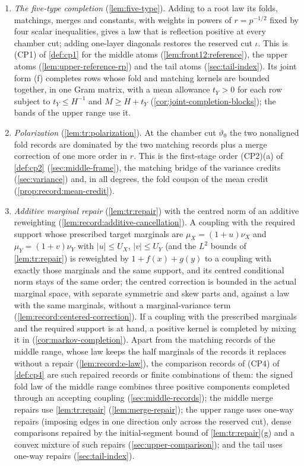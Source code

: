 \begin{enumerate}[label=(\arabic*)]
\item \emph{The five-type completion} (\cref{lem:five-type}). Adding to a
 root law its folds, matchings, merges and constants, with weights in powers
 of $r=p^{-1/2}$ fixed by four scalar inequalities, gives a law that is
 reflection positive at every chamber cut; adding one-layer diagonals
 restores the reserved cut $\iota$. This is (CP1) of \cref{def:cp1} for the
 middle atoms (\cref{lem:front12:reference}), the upper atoms
 (\cref{lem:upper-reference-rp}) and the tail atoms (\cref{sec:tail-index}).
 Its joint form (f) completes rows whose fold and matching kernels are bounded
 together, in one Gram matrix, with a mean allowance $t_Y>0$ for each row
 subject to $t_Y\le H^{-1}$ and $M\ge H+t_Y$
 (\cref{cor:joint-completion-blocks}); the bands of the upper range use it.
\item \emph{Polarization} (\cref{lem:tr:polarization}). At the chamber cut
 $\vartheta_0$ the two nonaligned fold records are dominated by the two
 matching records plus a merge correction of one more order in $r$. This is
 the first-stage order (CP2)(a) of \cref{def:cp2} (\cref{sec:middle-frame}),
 the matching bridge of the variance credits (\cref{sec:variance}) and, in all
 degrees, the fold coupon of the mean credit (\cref{prop:record:mean-credit}).
\item \emph{Additive marginal repair} (\cref{lem:tr:repair}) with the
 centred norm of an additive reweighting
 (\cref{lem:record:additive-cancellation}). A coupling with the required support whose prescribed target
 marginals are $\mu_X=(1+u)\nu_X$ and $\mu_Y=(1+v)\nu_Y$ with
 $|u|\le U_X$, $|v|\le U_Y$ (and the $L^2$ bounds of \cref{lem:tr:repair})
 is reweighted by $1+f(x)+g(y)$ to a coupling with exactly those marginals
 and the same support, and its centred conditional norm stays of the same order; the
 centred correction is bounded in the actual marginal space, with separate
 symmetric and skew parts and, against a law with the same marginals, without a
 marginal-variance term (\cref{lem:record:centered-correction}). If a coupling
 with the prescribed marginals and the required support is at hand, a positive
 kernel is completed by mixing it in (\cref{cor:markov-completion}). Apart from
 the matching records of the middle range, whose law keeps the half marginals of
 the records it replaces without a repair (\cref{lem:record:e-law}), the
 comparison records of (CP4) of \cref{def:cp4} are such repaired records or
 finite combinations of them: the signed fold law of the middle range combines
 three positive components completed through an accepting coupling
 (\cref{sec:middle-records}); the middle merge repairs use \cref{lem:tr:repair}
 (\cref{lem:merge-repair}); the upper range uses one-way repairs (imposing edges in one
direction only across the reserved cut), dense
 comparisons repaired by the initial-segment bound of \cref{lem:tr:repair}(g)
 and a convex mixture of such repairs (\cref{sec:upper-comparison}); and the
 tail uses one-way repairs
 (\cref{sec:tail-index}).
\end{enumerate}
